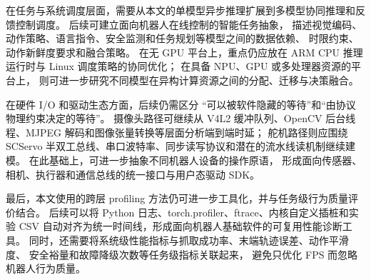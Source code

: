 \begin{conclusion}
在任务与系统调度层面，需要从本文的单模型异步推理扩展到多模型协同推理和反馈控制调度。
后续可建立面向机器人在线控制的智能任务抽象，
描述视觉编码、动作策略、语言指令、安全监测和任务规划等模型之间的数据依赖、
时限约束、动作新鲜度要求和融合策略。
在无 GPU 平台上，重点仍应放在 ARM CPU 推理运行时与 Linux 调度策略的协同优化；
在具备 NPU、GPU 或多处理器资源的平台上，
则可进一步研究不同模型在异构计算资源之间的分配、迁移与决策融合。

在硬件 I/O 和驱动生态方面，后续仍需区分
“可以被软件隐藏的等待”和“由协议物理约束决定的等待”。
摄像头路径可继续从 V4L2 缓冲队列、OpenCV 后台线程、MJPEG 解码和图像张量转换等层面分析端到端时延；
舵机路径则应围绕 SCServo 半双工总线、串口波特率、同步读写协议和潜在的流水线读机制继续建模。
在此基础上，可进一步抽象不同机器人设备的操作原语，
形成面向传感器、相机、执行器和通信总线的统一接口与用户态驱动 SDK。

最后，本文使用的跨层 profiling 方法仍可进一步工具化，并与任务级行为质量评价结合。
后续可以将 Python 日志、torch.profiler、ftrace、内核自定义插桩和实验 CSV
自动对齐为统一时间线，形成面向机器人基础软件的可复用性能诊断工具。
同时，还需要将系统级性能指标与抓取成功率、末端轨迹误差、动作平滑度、
安全裕量和故障降级次数等任务级指标关联起来，
避免只优化 FPS 而忽略机器人行为质量。
\endgroup
\end{conclusion}
